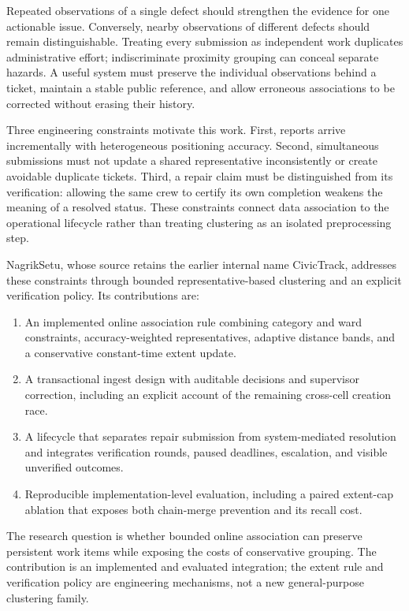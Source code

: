 \documentclass[conference,a4paper]{IEEEtran}
\begin{document}
Repeated observations of a single defect should strengthen the evidence for one actionable issue. Conversely, nearby observations of different defects should remain distinguishable. Treating every submission as independent work duplicates administrative effort; indiscriminate proximity grouping can conceal separate hazards. A useful system must preserve the individual observations behind a ticket, maintain a stable public reference, and allow erroneous associations to be corrected without erasing their history.

Three engineering constraints motivate this work. First, reports arrive incrementally with heterogeneous positioning accuracy. Second, simultaneous submissions must not update a shared representative inconsistently or create avoidable duplicate tickets. Third, a repair claim must be distinguished from its verification: allowing the same crew to certify its own completion weakens the meaning of a resolved status. These constraints connect data association to the operational lifecycle rather than treating clustering as an isolated preprocessing step.

NagrikSetu, whose source retains the earlier internal name CivicTrack, addresses these constraints through bounded representative-based clustering and an explicit verification policy. Its contributions are:
\begin{enumerate}
\item An implemented online association rule combining category and ward constraints, accuracy-weighted representatives, adaptive distance bands, and a conservative constant-time extent update.
\item A transactional ingest design with auditable decisions and supervisor correction, including an explicit account of the remaining cross-cell creation race.
\item A lifecycle that separates repair submission from system-mediated resolution and integrates verification rounds, paused deadlines, escalation, and visible unverified outcomes.
\item Reproducible implementation-level evaluation, including a paired extent-cap ablation that exposes both chain-merge prevention and its recall cost.
\end{enumerate}
The research question is whether bounded online association can preserve persistent work items while exposing the costs of conservative grouping. The contribution is an implemented and evaluated integration; the extent rule and verification policy are engineering mechanisms, not a new general-purpose clustering family.
\end{document}
